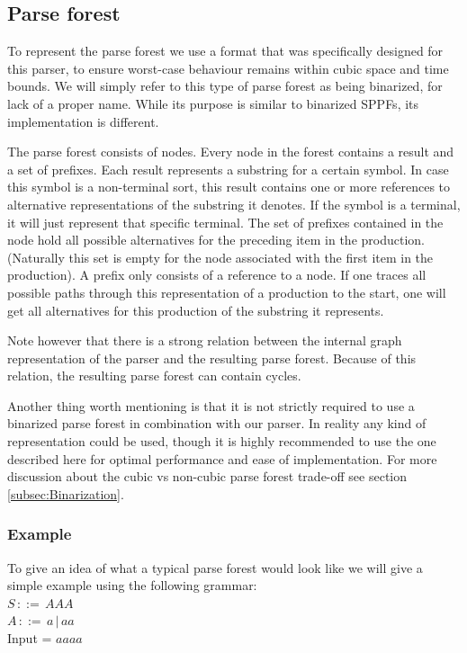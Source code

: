 \documentclass[a4paper,10pt]{article}
\begin{document}
\subsection{Parse forest}

To represent the parse forest we use a format that was specifically designed for this parser, to ensure worst-case behaviour remains within cubic space and time bounds. We will simply refer to this type of parse forest as being binarized, for lack of a proper name. While its purpose is similar to binarized SPPFs\cite{scott2007brnglr}, its implementation is different.

The parse forest consists of nodes. Every node in the forest contains a result and a set of prefixes. Each result represents a substring for a certain symbol. In case this symbol is a non-terminal sort, this result contains one or more references to alternative representations of the substring it denotes. If the symbol is a terminal, it will just represent that specific terminal. The set of prefixes contained in the node hold all possible alternatives for the preceding item in the production. (Naturally this set is empty for the node associated with the first item in the production). A prefix only consists of a reference to a node. If one traces all possible paths through this representation of a production to the start, one will get all alternatives for this production of the substring it represents.

Note however that there is a strong relation between the internal graph representation of the parser and the resulting parse forest. Because of this relation, the resulting parse forest can contain cycles.

Another thing worth mentioning is that it is not strictly required to use a binarized parse forest in combination with our parser. In reality any kind of representation could be used, though it is highly recommended to use the one described here for optimal performance and ease of implementation. For more discussion about the cubic vs non-cubic parse forest trade-off see section \ref{subsec:Binarization}.

\subsubsection{Example}
To give an idea of what a typical parse forest would look like we will give a simple example using the following grammar:\\
$S\,::=\,AAA$\\
$A\,::=\,a\,|\,aa$\\
Input = $aaaa$
\end{document}

